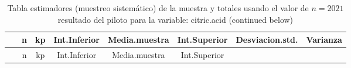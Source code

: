 \documentclass[
]{article}
\begin{document}
\begin{longtable}[]{@{}cccccccc@{}}
\caption{Tabla estimadores (muestreo sistemático) de la muestra y
totales usando el valor de \(n = 2021\) resultado del piloto para la
variable: citric.acid (continued below)}\tabularnewline
\toprule
\begin{minipage}[b]{0.18\columnwidth}\centering
~\strut
\end{minipage} & \begin{minipage}[b]{0.05\columnwidth}\centering
n\strut
\end{minipage} & \begin{minipage}[b]{0.03\columnwidth}\centering
kp\strut
\end{minipage} & \begin{minipage}[b]{0.10\columnwidth}\centering
Int.Inferior\strut
\end{minipage} & \begin{minipage}[b]{0.11\columnwidth}\centering
Media.muestra\strut
\end{minipage} & \begin{minipage}[b]{0.10\columnwidth}\centering
Int.Superior\strut
\end{minipage} & \begin{minipage}[b]{0.12\columnwidth}\centering
Desviacion.std.\strut
\end{minipage} & \begin{minipage}[b]{0.08\columnwidth}\centering
Varianza\strut
\end{minipage}\tabularnewline
\midrule
\endfirsthead
\toprule
\begin{minipage}[b]{0.18\columnwidth}\centering
~\strut
\end{minipage} & \begin{minipage}[b]{0.05\columnwidth}\centering
n\strut
\end{minipage} & \begin{minipage}[b]{0.03\columnwidth}\centering
kp\strut
\end{minipage} & \begin{minipage}[b]{0.10\columnwidth}\centering
Int.Inferior\strut
\end{minipage} & \begin{minipage}[b]{0.11\columnwidth}\centering
Media.muestra\strut
\end{minipage} & \begin{minipage}[b]{0.10\columnwidth}\centering
Int.Superior\strut
\end{minipage} & \begin{minipage}[b]{0.12\columnwidth}\centering

\end{minipage}
\end{longtable}
\end{document}
